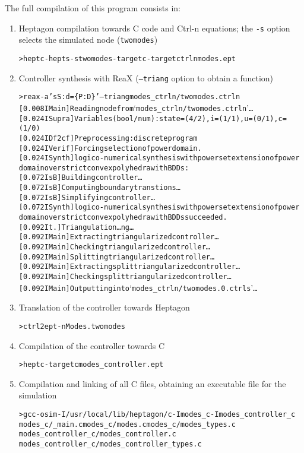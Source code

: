 \documentclass[a4paper]{article}
\begin{document}
The full compilation of this program consists in:
\begin{enumerate}
\item Heptagon compilation towards C code and Ctrl-n equations; the
  \texttt{-s} option selects the simulated node (\texttt{twomodes})
\begin{alltt}
\textcolor{deepgreen}{> heptc -hepts -s twomodes -target c -target ctrln modes.ept}
\end{alltt}
\item Controller synthesis with ReaX (\texttt{--triang} option to
  obtain a function)
\begin{alltt}
\textcolor{deepgreen}{> reax -a 'sS:d=\{P:D\}' --triang modes_ctrln/twomodes.ctrln}
[0.008 I Main] Reading node from `modes_ctrln/twomodes.ctrln'…
[0.024 I Supra] Variables(bool/num): state=(4/2), i=(1/1), u=(0/1), c=(1/0)
[0.024 I Df2cf] Preprocessing: discrete program
[0.024 I Verif] Forcing selection of power domain.
[0.024 I Synth] logico-numerical synthesis with powerset extension of power
                domain over strict convex polyhedra with BDDs:
[0.072 I sB] Building controller…
[0.072 I sB] Computing boundary transtions…
[0.072 I sB] Simplifying controller…
[0.072 I Synth] logico-numerical synthesis with powerset extension of power
                domain over strict convex polyhedra with BDDs succeeded.
[0.092 I t.] Triangulation…ng…
[0.092 I Main] Extracting triangularized controller…
[0.092 I Main] Checking triangularized controller…
[0.092 I Main] Splitting triangularized controller…
[0.092 I Main] Extracting split triangularized controller…
[0.092 I Main] Checking split triangularized controller…
[0.092 I Main] Outputting into `modes_ctrln/twomodes.0.ctrls'…
\end{alltt}
\item Translation of the controller towards Heptagon
\begin{alltt}
\textcolor{deepgreen}{> ctrl2ept -n Modes.twomodes}
\end{alltt}
\item Compilation of the controller towards C
\begin{alltt}
\textcolor{deepgreen}{> heptc -target c modes_controller.ept}
\end{alltt}
\item Compilation and linking of all C files, obtaining an executable
  file for the simulation
\begin{alltt}
\textcolor{deepgreen}{> gcc -o sim -I/usr/local/lib/heptagon/c -Imodes_c -Imodes_controller_c
             modes_c/_main.c modes_c/modes.c modes_c/modes_types.c
             modes_controller_c/modes_controller.c
             modes_controller_c/modes_controller_types.c}
\end{alltt}
\end{enumerate}
\end{document}
